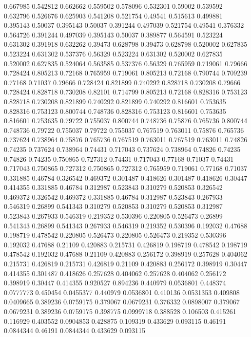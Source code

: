 0.667985 0.542812
0.662662 0.559502
0.578096 0.532301
0.59002 0.539592
0.632796 0.526676
0.625903 0.541208
0.521754 0.49541
0.515613 0.499881
0.395143 0.50037
0.395143 0.50037
0.391244 0.497039
0.521754 0.49541
0.376332 0.564726
0.391244 0.497039
0.395143 0.50037
0.389877 0.564591
0.523224 0.631302
0.391918 0.632262
0.39473 0.628798
0.39473 0.628798
0.520002 0.627835
0.523224 0.631302
0.537376 0.56329
0.523224 0.631302
0.520002 0.627835
0.520002 0.627835
0.524064 0.563585
0.537376 0.56329
0.765959 0.719061
0.79666 0.728424
0.805213 0.72168
0.765959 0.719061
0.805213 0.72168
0.790744 0.709239
0.77168 0.71037
0.79666 0.728424
0.821899 0.740292
0.828718 0.730208
0.79666 0.728424
0.828718 0.730208
0.82101 0.714799
0.805213 0.72168
0.828316 0.753123
0.828718 0.730208
0.821899 0.740292
0.821899 0.740292
0.816601 0.753635
0.828316 0.753123
0.800744 0.748736
0.828316 0.753123
0.816601 0.753635
0.816601 0.753635
0.79722 0.755037
0.800744 0.748736
0.75876 0.765736
0.800744 0.748736
0.79722 0.755037
0.79722 0.755037
0.767519 0.763011
0.75876 0.765736
0.737624 0.738964
0.75876 0.765736
0.767519 0.763011
0.767519 0.763011
0.74826 0.74235
0.737624 0.738964
0.74431 0.717043
0.737624 0.738964
0.74826 0.74235
0.74826 0.74235
0.750865 0.727312
0.74431 0.717043
0.77168 0.71037
0.74431 0.717043
0.750865 0.727312
0.750865 0.727312
0.765959 0.719061
0.77168 0.71037
0.331885 0.46784
0.326542 0.469372
0.301487 0.418626
0.301487 0.418626
0.30447 0.414355
0.331885 0.46784
0.312987 0.523843
0.310279 0.520853
0.326542 0.469372
0.326542 0.469372
0.331885 0.46784
0.312987 0.523843
0.267933 0.546319
0.26899 0.541343
0.310279 0.520853
0.310279 0.520853
0.312987 0.523843
0.267933 0.546319
0.219352 0.530396
0.220805 0.526473
0.26899 0.541343
0.26899 0.541343
0.267933 0.546319
0.219352 0.530396
0.192032 0.47688
0.198719 0.478542
0.220805 0.526473
0.220805 0.526473
0.219352 0.530396
0.192032 0.47688
0.21109 0.420883
0.215731 0.426819
0.198719 0.478542
0.198719 0.478542
0.192032 0.47688
0.21109 0.420883
0.256172 0.398919
0.257628 0.404062
0.215731 0.426819
0.215731 0.426819
0.21109 0.420883
0.256172 0.398919
0.30447 0.414355
0.301487 0.418626
0.257628 0.404062
0.257628 0.404062
0.256172 0.398919
0.30447 0.414355
0.920527 0.894236
0.440979 0.0536801
0.448374 0.0777773
0.450454 0.0455377
0.440979 0.0536801
0.410136 0.0531353
0.409808 0.0409665
0.389236 0.0759175
0.379067 0.0679231
0.376332 0.0898007
0.379067 0.0679231
0.389236 0.0759175
0.398775 0.0999718
0.388528 0.106503
0.415261 0.116929
0.403552 0.0904853
0.428875 0.109319
0.433629 0.093115
0.46191 0.0844344
0.46191 0.0844344
0.433629 0.093115
